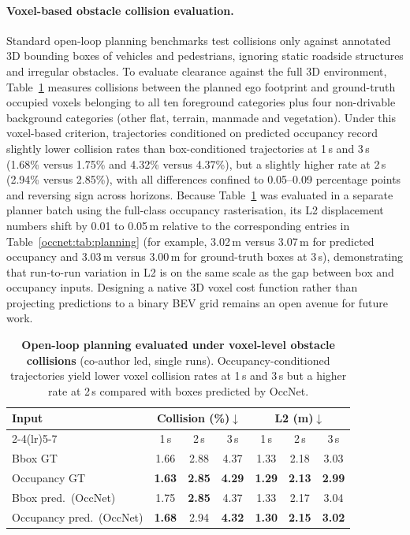 \paragraph{Voxel-based obstacle collision evaluation.} Standard open-loop planning benchmarks test collisions only against annotated 3D bounding boxes of vehicles and pedestrians, ignoring static roadside structures and irregular obstacles. To evaluate clearance against the full 3D environment, Table~\ref{occnet:tab:occupancy_metrics} measures collisions between the planned ego footprint and ground-truth occupied voxels belonging to all ten foreground categories plus four non-drivable background categories (other flat, terrain, manmade and vegetation). Under this voxel-based criterion, trajectories conditioned on predicted occupancy record slightly lower collision rates than box-conditioned trajectories at 1\,s and 3\,s (1.68\% versus 1.75\% and 4.32\% versus 4.37\%), but a slightly higher rate at 2\,s (2.94\% versus 2.85\%), with all differences confined to 0.05--0.09 percentage points and reversing sign across horizons. Because Table~\ref{occnet:tab:occupancy_metrics} was evaluated in a separate planner batch using the full-class occupancy rasterisation, its L2 displacement numbers shift by 0.01 to 0.05\,m relative to the corresponding entries in Table~\ref{occnet:tab:planning} (for example, 3.02\,m versus 3.07\,m for predicted occupancy and 3.03\,m versus 3.00\,m for ground-truth boxes at 3\,s), demonstrating that run-to-run variation in L2 is on the same scale as the gap between box and occupancy inputs. Designing a native 3D voxel cost function rather than projecting predictions to a binary BEV grid remains an open avenue for future work.

\begin{table}[t]
  \centering
  \caption[Trajectory evaluation under voxel-level obstacle collisions]{\textbf{Open-loop planning evaluated under voxel-level obstacle collisions} (co-author led, single runs). Occupancy-conditioned trajectories yield lower voxel collision rates at 1\,s and 3\,s but a higher rate at 2\,s compared with boxes predicted by OccNet.}
  \label{occnet:tab:occupancy_metrics}
  \begin{tabular}{lcccccc}
    \toprule
    \multirow{2}{*}{Input} & \multicolumn{3}{c}{Collision (\%)$\downarrow$} & \multicolumn{3}{c}{L2 (m)$\downarrow$} \\
    \cmidrule(lr){2-4}\cmidrule(lr){5-7}
     & 1\,s & 2\,s & 3\,s & 1\,s & 2\,s & 3\,s \\
    \midrule
    Bbox GT      & 1.66 & 2.88 & 4.37 & 1.33 & 2.18 & 3.03 \\
    Occupancy GT & \textbf{1.63} & \textbf{2.85} & \textbf{4.29} & \textbf{1.29} & \textbf{2.13} & \textbf{2.99} \\
    \midrule
    Bbox pred.\ (OccNet)      & 1.75 & \textbf{2.85} & 4.37 & 1.33 & 2.17 & 3.04 \\
    \rowcolor{perceive!10} Occupancy pred.\ (OccNet) & \textbf{1.68} & 2.94 & \textbf{4.32} & \textbf{1.30} & \textbf{2.15} & \textbf{3.02} \\
    \bottomrule
  \end{tabular}
\end{table}

